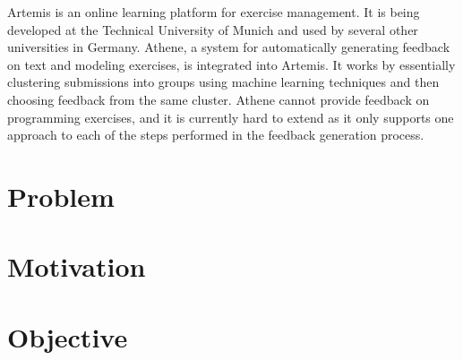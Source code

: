 Artemis is an online learning platform for exercise management. It is being developed at the Technical University of Munich and used by several other universities in Germany. Athene, a system for automatically generating feedback on text and modeling exercises, is integrated into Artemis. It works by essentially clustering submissions into groups using machine learning techniques and then choosing feedback from the same cluster. 
Athene cannot provide feedback on programming exercises, and it is currently hard to extend as it only supports one approach to each of the steps performed in the feedback generation process.

\section*{Problem}
        
\section*{Motivation}
        
\section*{Objective}
        
